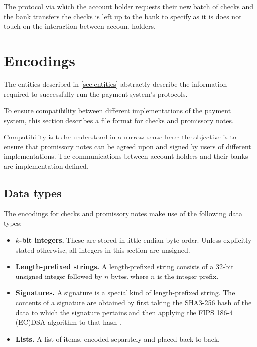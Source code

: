 \documentclass[12pt,a4paper]{article}
\begin{document}
\begin{multicols}{2}
	The protocol via which the account holder requests their new batch of checks and the bank transfers the checks is left up to the bank to specify as it is does not touch on the interaction between account holders.
	
	
	\section{Encodings}
	
	The entities described in \autoref{sec:entities} abstractly describe the information required to successfully run the payment system's protocols.
	
	To ensure compatibility between different implementations of the payment system, this section describes a file format for checks and promissory notes.
	
	Compatibility is to be understood in a narrow sense here: the objective is to ensure that promissory notes can be agreed upon and signed by users of different implementations. The communications between account holders and their banks are implementation-defined.
	
	\subsection{Data types}
	\label{sec:data-types}
	
	The encodings for checks and promissory notes make use of the following data types:
	
	\begin{itemize}
		\item \textbf{$k$-bit integers.} These are stored in little-endian byte order. Unless explicitly stated otherwise, all integers in this section are unsigned.
		
		\item \textbf{Length-prefixed strings.} A length-prefixed string consists of a 32-bit unsigned integer followed by $n$ bytes, where $n$ is the integer prefix.
		
		\item \textbf{Signatures.} A signature is a special kind of length-prefixed string. The contents of a signature are obtained by first taking the SHA3-256 hash of the data to which the signature pertains and then applying the FIPS 186-4 (EC)DSA algorithm to that hash \cite{fips-202-sha3, fips-186-4-dss}.
		
		\item \textbf{Lists.} A list of items, encoded separately and placed back-to-back.
		

\end{itemize}
\end{multicols}
\end{document}
